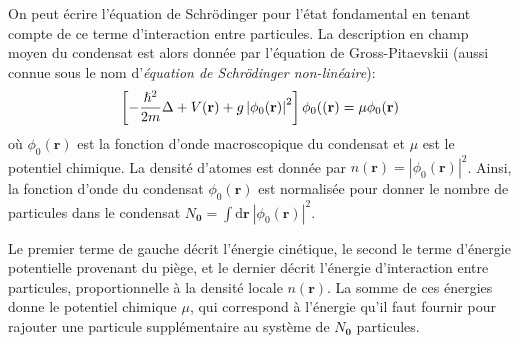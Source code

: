 On peut écrire l'équation de Schrödinger pour l'état fondamental en tenant compte de ce terme d'interaction entre particules. La description en champ moyen du condensat est alors donnée par l'équation de Gross-Pitaevskii (aussi connue sous le nom d'\emph{équation de Schrödinger non-linéaire}):
\begin{equation}
\left[ -\frac{\hslash^2}{2m}\Delta + V(\mathbf{r}) + g\left|\phi_0(\mathbf{r})\right|^2 \right] \phi_0((\mathbf{r}) = \mu \phi_0(\mathbf{r})
\label{eq:gross_pitaevskii}
\end{equation}
où $\phi_0(\mathbf{r})$ est la fonction d'onde macroscopique du condensat et $\mu$ est le potentiel chimique. La densité d'atomes est donnée par $n(\mathbf{r})=\left| \phi_0(\mathbf{r}) \right|^2$. Ainsi, la fonction d'onde du condensat $\phi_0(\mathbf{r})$ est normalisée pour donner le nombre de particules dans le condensat $N_{\mathbf{0}}=\int{\mathrm{d}\mathbf{r} \: \left| \phi_0(\mathbf{r}) \right|^2}$.

Le premier terme de gauche décrit l'énergie cinétique, le second le terme d'énergie potentielle provenant du piège, et le dernier décrit l'énergie d'interaction entre particules, proportionnelle à la densité locale $n(\mathbf{r})$. La somme de ces énergies donne le potentiel chimique $\mu$, qui correspond à l'énergie qu'il faut fournir pour rajouter une particule supplémentaire au système de $N_{\mathbf{0}}$ particules.




